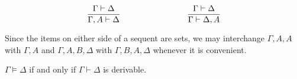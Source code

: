 \documentclass{article}
\begin{document}
\[%
\sequent{\Gamma}{\Delta}{\Gamma, A}{\Delta} \hspace{8em}
\sequent{\Gamma}{\Delta}{\Gamma}{\Delta, A}
\]
\begin{proposition}
    Since the items on either side of a sequent are sets, we may interchange $\Gamma, A, A$ with $\Gamma, A$ and $\Gamma, A, B, \Delta$ with $\Gamma, B, A, \Delta$ whenever it is convenient.
\end{proposition}

\begin{proposition}
    $\Gamma \models \Delta$ if and only if $\Gamma \vdash \Delta$ is derivable.
\end{proposition}
\end{document}
